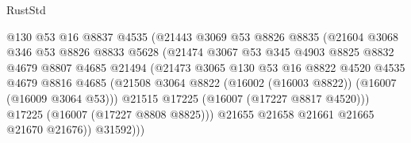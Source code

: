 \begin{lexlean}{RustStd}
\begin{coremodule}
                                  @130
                                  @53
                                  @16
                                  @8837
                                  @4535
                                  (@21443
                                    @3069
                                    @53
                                    @8826
                                    @8835
                                    (@21604
                                      @3068
                                      @346
                                      @53
                                      @8826
                                      @8833
                                      @5628
                                      (@21474
                                        @3067
                                        @53
                                        @345
                                        @4903
                                        @8825
                                        @8832
                                        @4679
                                        @8807
                                        @4685
                                        @21494
                                        (@21473
                                          @3065
                                          @130
                                          @53
                                          @16
                                          @8822
                                          @4520
                                          @4535
                                          @4679
                                          @8816
                                          @4685
                                          (@21508
                                            @3064
                                            @8822
                                            (@16002 (@16003 @8822))
                                            (@16007 (@16009 @3064 @53)))
                                          @21515
                                          @17225
                                          (@16007 (@17227 @8817 @4520)))
                                        @17225
                                        (@16007 (@17227 @8808 @8825)))
                                      @21655
                                      @21658
                                      @21661
                                      @21665
                                      @21670
                                      @21676))
                                  @31592)))

\end{coremodule}
\end{lexlean}
